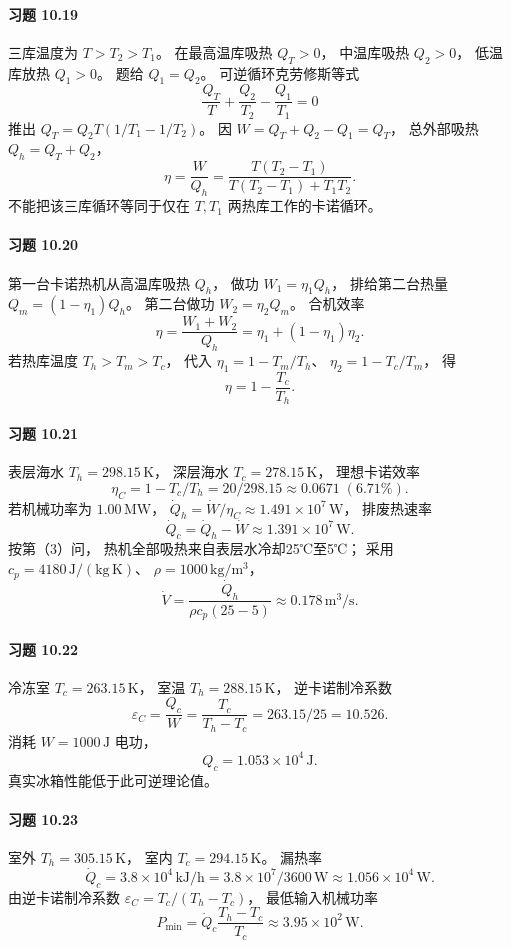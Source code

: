 \paragraph{习题 10.19}
三库温度为 \(T>T_2>T_1\)。
在最高温库吸热 \(Q_T>0\)，
中温库吸热 \(Q_2>0\)，
低温库放热 \(Q_1>0\)。
题给 \(Q_1=Q_2\)。
可逆循环克劳修斯等式
\[
 \frac{Q_T}{T}+\frac{Q_2}{T_2}
 -\frac{Q_1}{T_1}=0
\]
推出
\(Q_T=Q_2T(1/T_1-1/T_2)\)。
因 \(W=Q_T+Q_2-Q_1=Q_T\)，
总外部吸热 \(Q_h=Q_T+Q_2\)，
\[
 \boxed{\eta=\frac{W}{Q_h}
 =\frac{T(T_2-T_1)}
 {T(T_2-T_1)+T_1T_2}}.
\]
不能把该三库循环等同于仅在
\(T,T_1\) 两热库工作的卡诺循环。

\paragraph{习题 10.20}
第一台卡诺热机从高温库吸热 \(Q_h\)，
做功 \(W_1=\eta_1Q_h\)，
排给第二台热量
\(Q_m=(1-\eta_1)Q_h\)。
第二台做功
\(W_2=\eta_2Q_m\)。
合机效率
\[
 \boxed{\eta=\frac{W_1+W_2}{Q_h}
 =\eta_1+(1-\eta_1)\eta_2}.
\]
若热库温度 \(T_h>T_m>T_c\)，
代入
\(\eta_1=1-T_m/T_h\)、
\(\eta_2=1-T_c/T_m\)，
得
\[
 \boxed{\eta=1-\frac{T_c}{T_h}}.
\]

\paragraph{习题 10.21}
表层海水 \(T_h=298.15\,\mathrm K\)，
深层海水 \(T_c=278.15\,\mathrm K\)，
理想卡诺效率
\[
 \boxed{\eta_C=1-T_c/T_h=20/298.15
 \approx0.0671\;(6.71\%)}.
\]
若机械功率为 \(1.00\,\mathrm{MW}\)，
\(\dot Q_h=\dot W/\eta_C
 \approx1.491\times10^7\,\mathrm W\)，
排废热速率
\[
 \boxed{\dot Q_c=\dot Q_h-\dot W
 \approx1.391\times10^7\,\mathrm W}.
\]
按第（3）问，
热机全部吸热来自表层水冷却25℃至5℃；
采用 \(c_p=4180\,\mathrm{J/(kg\,K)}\)、
\(\rho=1000\,\mathrm{kg/m^3}\)，
\[
 \boxed{\dot V=\frac{\dot Q_h}
 {\rho c_p(25-5)}
 \approx0.178\,\mathrm{m^3/s}}.
\]

\paragraph{习题 10.22}
冷冻室 \(T_c=263.15\,\mathrm K\)，
室温 \(T_h=288.15\,\mathrm K\)，
逆卡诺制冷系数
\[
 \varepsilon_C=\frac{Q_c}{W}
 =\frac{T_c}{T_h-T_c}
 =263.15/25=10.526.
\]
消耗 \(W=1000\,\mathrm J\) 电功，
\[
 \boxed{Q_c=1.053\times10^4\,\mathrm J}.
\]
真实冰箱性能低于此可逆理论值。

\paragraph{习题 10.23}
室外 \(T_h=305.15\,\mathrm K\)，
室内 \(T_c=294.15\,\mathrm K\)。
漏热率
\[
 \dot Q_c=3.8\times10^4\,
 \mathrm{kJ/h}
 =3.8\times10^7/3600\,
 \mathrm W
 \approx1.056\times10^4\,\mathrm W.
\]
由逆卡诺制冷系数
\(\varepsilon_C=T_c/(T_h-T_c)\)，
最低输入机械功率
\[
 \boxed{P_{\min}
 =\dot Q_c\frac{T_h-T_c}{T_c}
 \approx3.95\times10^2\,\mathrm W}.
\]


